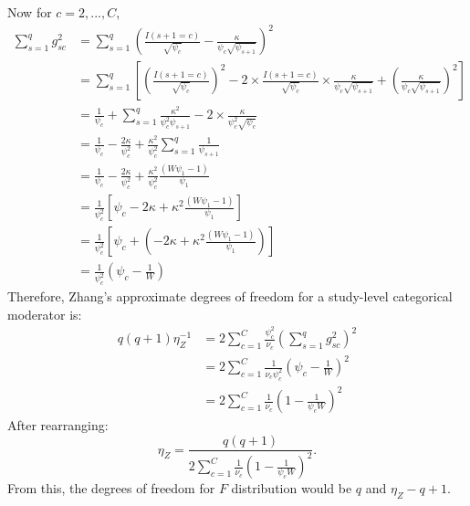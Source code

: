 Now for $c = 2,...,C$, 
\begin{equation}
    \begin{aligned}
\sum_{s=1}^q g_{sc}^2 &= \sum_{s=1}^q \left(\frac{I(s+1 = c)}{\sqrt{\psi_{c}}} - \frac{\kappa}{\psi_c \sqrt{\psi_{s+1}}}\right)^2 \\
&= \sum_{s=1}^q \left[ \left( \frac{I(s+1 = c)}{\sqrt{\psi_c}} \right)^2 - 2 \times \frac{I(s+1 = c)}{\sqrt{\psi_c}} \times \frac{\kappa}{\psi_c \sqrt{\psi_{s+1}}} + \left( \frac{\kappa}{\psi_c \sqrt{\psi_{s+1}}} \right)^2 \right] \\
&= \frac{1}{\psi_c} + \sum_{s=1}^q \frac{\kappa^2}{\psi_c^2 \psi_{s+1}} - 2 \times \frac{\kappa}{\psi_c^2 \sqrt{\psi_{c}}}\\
&= \frac{1}{\psi_c} - \frac{2 \kappa}{\psi_c^2} + \frac{\kappa^2}{\psi_c^2}\sum_{s=1}^q \frac{1}{\psi_{s+1}} \\
&= \frac{1}{\psi_c} - \frac{2 \kappa}{\psi_c^2} + \frac{\kappa^2}{\psi_c^2}\frac{(W \psi_1 - 1)}{\psi_1} \\
&= \frac{1}{\psi_c^2}\left[\psi_c - 2\kappa + \kappa^2\frac{(W \psi_1 - 1)}{\psi_1}\right] \\
&= \frac{1}{\psi_c^2}\left[\psi_c + \left(- 2\kappa + \kappa^2\frac{(W \psi_1 - 1)}{\psi_1} \right) \right] \\
&= \frac{1}{\psi_c^2} \left(\psi_c - \frac{1}{W}\right)
\end{aligned}
\nonumber
\end{equation}
Therefore, Zhang's approximate degrees of freedom for a study-level categorical moderator is:
\begin{equation}
    \begin{aligned}
q(q + 1)\eta_Z^{-1} &= 2\sum_{c=1}^C \frac{\psi_c^2}{\nu_c} \left(\sum_{s=1}^q g_{sc}^2\right)^2 \\
&= 2\sum_{c=1}^C \frac{1}{\nu_c \psi_c^2}\left(\psi_c - \frac{1}{W}\right)^2 \\
&= 2\sum_{c=1}^C \frac{1}{\nu_c}\left(1 - \frac{1}{\psi_c W}\right)^2
\end{aligned}
\nonumber
\end{equation}
After rearranging: 
\begin{equation}
    \eta_Z = \frac{q(q + 1)}{2 \sum_{c=1}^C \frac{1}{\nu_c}\left(1 - \frac{1}{\psi_c W}\right)^2}.
    \nonumber
\end{equation}
From this, the degrees of freedom for $F$ distribution would be $q$ and $\eta_Z - q + 1$.

